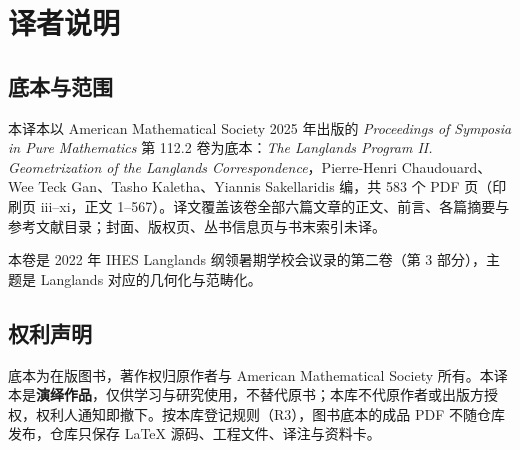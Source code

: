 \chapter*{译者说明}

\section*{底本与范围}
本译本以 American Mathematical Society 2025 年出版的 \emph{Proceedings of Symposia in Pure Mathematics} 第 112.2 卷为底本：\emph{The Langlands Program II. Geometrization of the Langlands Correspondence}，Pierre-Henri Chaudouard、Wee Teck Gan、Tasho Kaletha、Yiannis Sakellaridis 编，共 583 个 PDF 页（印刷页 iii–xi，正文 1–567）。译文覆盖该卷全部六篇文章的正文、前言、各篇摘要与参考文献目录；封面、版权页、丛书信息页与书末索引未译。

本卷是 2022 年 IHES Langlands 纲领暑期学校会议录的第二卷（第 3 部分），主题是 Langlands 对应的几何化与范畴化。

\section*{权利声明}
底本为在版图书，著作权归原作者与 American Mathematical Society 所有。本译本是\textbf{演绎作品}，仅供学习与研究使用，不替代原书；本库不代原作者或出版方授权，权利人通知即撤下。按本库登记规则（R3），图书底本的成品 PDF 不随仓库发布，仓库只保存 \LaTeX{} 源码、工程文件、译注与资料卡。

